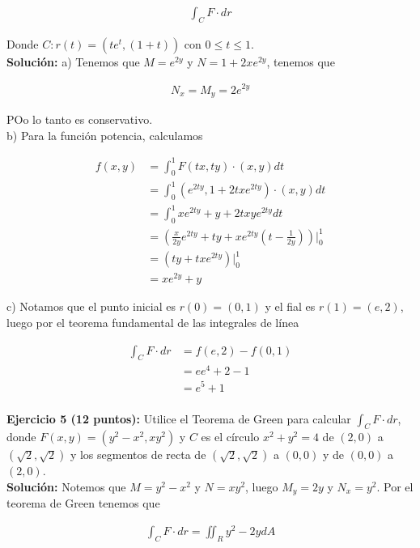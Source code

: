 \documentclass[a4paper]{article}
\begin{document}
\begin{align*}
    \int_C F \cdot dr 
\end{align*}

Donde $C: r(t) =(te^t,(1+t))$ con $0 \leq t \leq 1$. \\

\textbf{Solución: } a) Tenemos que $M= e^{2y}$ y $N= 1+2xe^{2y}$, tenemos que

\begin{align*}
    N_x=M_y= 2e^{2y}
\end{align*}

POo lo tanto es conservativo. \\


b) Para la función potencia, calculamos

\begin{align*}
    f(x,y) &= \int_0^1 F(tx,ty) \cdot (x,y) dt \\
    &= \int_0^1 (e^{2ty}, 1+2txe^{2ty} )\cdot (x,y) dt \\
    &= \int_0^1 xe^{2ty} + y+2txye^{2ty}  dt \\
    &= \left(\frac{x}{2y}e^{2ty}+ty+xe^{2ty}\left(t-\frac{1}{2y}\right) \right)\Big|_0^1\\
    &= \left(ty+txe^{2ty} \right)\Big|_0^1\\
    &= xe^{2y}+y
\end{align*}

c) Notamos que el punto inicial es $r(0)=(0,1)$ y el fial es $r(1) = (e,2)$, luego por el teorema fundamental de las integrales de línea

\begin{align*}
    \int_C F \cdot dr &= f(e,2) -f(0,1) \\
    &= ee^4+2 -1 \\
    &= e^5+1 \\
\end{align*}


\newpage


\textbf{Ejercicio 5 (12 puntos):} Utilice el Teorema de Green para calcular $\displaystyle \int_C F \cdot dr$, donde $F(x,y) =(y^2-x^2,xy^2)$  y $C$ es el círculo $x^2+y^2=4$ de $(2,0)$ a $(\sqrt{2},\sqrt{2})$  y  los segmentos de recta de $(\sqrt{2},\sqrt{2})$ a $(0,0)$ y de $(0,0)$ a $(2,0)$. \\

\textbf{Solución: } Notemos que $M= y^2-x^2$ y $N= xy^2$, luego $M_y= 2y$ y $N_x= y^2$. Por el teorema de Green tenemos que 

\begin{align*}
    \int_C F \cdot dr = \iint_R y^2-2y dA 
\end{align*}
\end{document}

